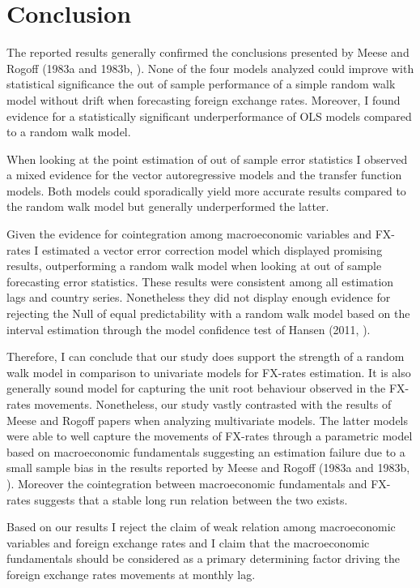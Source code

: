 \section{Conclusion}
\label{sec:conclusion}

The reported results generally confirmed the conclusions presented by
Meese and Rogoff (1983a and 1983b, \cite{MeeseRogoffa, MeeseRogoffb}).
None of the four models analyzed could improve with statistical
significance the out of sample performance of a simple random walk
model without drift when forecasting foreign exchange rates. Moreover,
I found evidence for a statistically significant underperformance of
OLS models compared to a random walk model.

When looking at the point estimation of out of sample error statistics
I observed a mixed evidence for the vector autoregressive models and
the transfer function models. Both models could sporadically yield
more accurate results compared to the random walk model but generally
underperformed the latter.

Given the evidence for cointegration among macroeconomic variables and
FX-rates I estimated a vector error correction model which displayed
promising results, outperforming a random walk model when looking at
out of sample forecasting error statistics. These results were
consistent among all estimation lags and country series. Nonetheless
they did not display enough evidence for rejecting the Null of equal
predictability with a random walk model based on the interval
estimation through the model confidence test of Hansen (2011,
\cite{HansenMCS}).

Therefore, I can conclude that our study does support the strength of
a random walk model in comparison to univariate models for FX-rates
estimation. It is also generally sound model for capturing the unit
root behaviour observed in the FX-rates movements. Nonetheless, our
study vastly contrasted with the results of Meese and Rogoff papers
when analyzing multivariate models. The latter models were able to
well capture the movements of FX-rates through a parametric model
based on macroeconomic fundamentals suggesting an estimation failure
due to a small sample bias in the results reported by Meese and Rogoff
(1983a and 1983b, \cite{MeeseRogoffa, MeeseRogoffb}). Moreover the
cointegration between macroeconomic fundamentals and FX-rates suggests
that a stable long run relation between the two exists.

Based on our results I reject the claim of weak relation among
macroeconomic variables and foreign exchange rates and I claim that
the macroeconomic fundamentals should be considered as a primary
determining factor driving the foreign exchange rates movements at
monthly lag.

